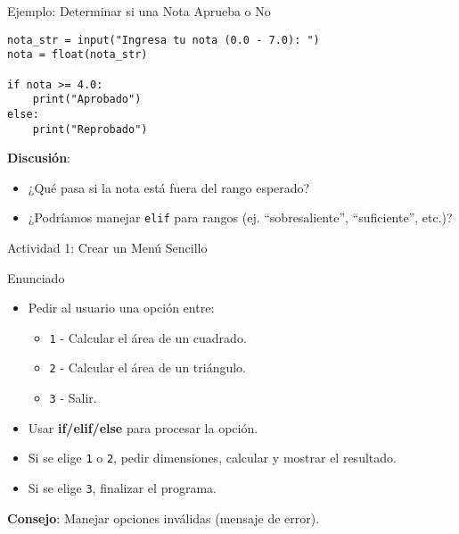 \documentclass[10pt]{beamer}
\begin{document}
\begin{frame}[fragile]{Ejemplo: Determinar si una Nota Aprueba o No}
\begin{verbatim}
nota_str = input("Ingresa tu nota (0.0 - 7.0): ")
nota = float(nota_str)

if nota >= 4.0:
    print("Aprobado")
else:
    print("Reprobado")
\end{verbatim}
\textbf{Discusión}:
\begin{itemize}
  \item ¿Qué pasa si la nota está fuera del rango esperado?
  \item ¿Podríamos manejar \texttt{elif} para rangos (ej. “sobresaliente”, “suficiente”, etc.)?
\end{itemize}
\end{frame}

\begin{frame}{Actividad 1: Crear un Menú Sencillo}
  \begin{block}{Enunciado}
    \begin{itemize}
      \item Pedir al usuario una opción entre:
        \begin{itemize}
          \item \texttt{1} - Calcular el área de un cuadrado.
          \item \texttt{2} - Calcular el área de un triángulo.
          \item \texttt{3} - Salir.
        \end{itemize}
      \item Usar \textbf{if/elif/else} para procesar la opción.
      \item Si se elige \texttt{1} o \texttt{2}, pedir dimensiones, calcular y mostrar el resultado.
      \item Si se elige \texttt{3}, finalizar el programa.
    \end{itemize}
  \end{block}
  \textbf{Consejo}: Manejar opciones inválidas (mensaje de error).
\end{frame}

\end{document}

